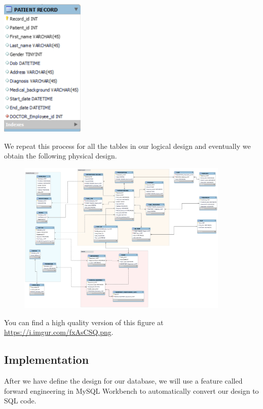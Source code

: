 \documentclass[a4paper]{article}
\numberwithin{equation}{section}
\begin{document}
    \begin{center}
        \includegraphics[width=0.3\textwidth]{assets/physical_ex.PNG}
    \end{center}

We repeat this process for all the tables in our logical design and eventually we obtain the following physical design. 

\begin{figure}[H]
  \centering
  \includegraphics[width=0.9\textwidth]{./assets/logical.png}\label{Logical design}
\end{figure}

You can find a high quality version of this figure at \url{https://i.imgur.com/fxAsCSQ.png}.

\subsection{Implementation}
After we have define the design for our database, we will use a feature called forward engineering in MySQL Workbench to automatically convert our design to SQL code. 
\end{document}
